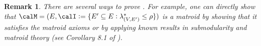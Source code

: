 \documentclass{article}
\newtheorem{remark}{Remark}[section]
\begin{document}
\begin{remark}
    There are several ways to prove . For example, one can directly show that $\calM = (E, \calI := \{E'\subseteq E : \lambda^*_{(V, E')} \leq \rho\})$ is a matroid by showing that it satisfies the matroid axioms or by
    applying known results in submodularity and matroid theory (see Corollary 8.1 of \cite{Welsh-book}).
\end{remark} 
\end{document}

